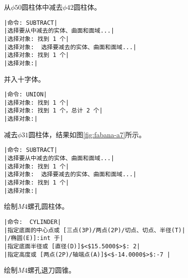 \begin{procedure}
从$\phi 50$圆柱体中减去$\phi 42$圆柱体。
\begin{lstlisting}
|命令: SUBTRACT|
|选择要从中减去的实体、曲面和面域...|
|选择对象: 找到 1 个|
|选择对象:  选择要减去的实体、曲面和面域...|
|选择对象: 找到 1 个|
|选择对象:|
\end{lstlisting}
并入十字体。
\begin{lstlisting}
|命令: UNION|
|选择对象: 找到 1 个|
|选择对象: 找到 1 个，总计 2 个|
|选择对象:|
\end{lstlisting}
减去$\phi 31$圆柱体，结果如图\ref{fig:fabana-a7}所示。
\begin{lstlisting}
|命令: SUBTRACT|
|选择要从中减去的实体、曲面和面域...|
|选择对象: 找到 1 个|
|选择对象:  选择要减去的实体、曲面和面域...|
|选择对象: 找到 1 个|
|选择对象:|
\end{lstlisting}
\item 绘制$M4$螺孔圆柱体。
\begin{lstlisting}
|命令:  CYLINDER|
|指定底面的中心点或 [三点(3P)/两点(2P)/切点、切点、半径(T)|
|/椭圆(E)]:int 于|
|指定底面半径或 [直径(D)]$<$15.5000$>$: 2|
|指定高度或 [两点(2P)/轴端点(A)]$<$-14.0000$>$:-7 |
\end{lstlisting}
\item 绘制$M4$螺孔退刀圆锥。


\end{procedure}

